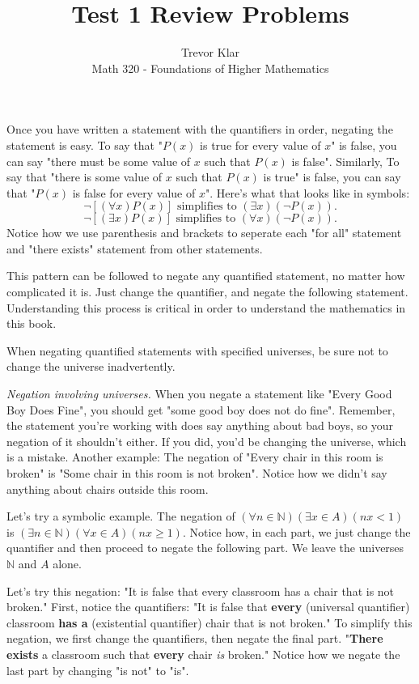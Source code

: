 \documentclass[10pt,letterpaper]{article}
\author{Trevor Klar\\
Math 320 - Foundations of Higher Mathematics}
\title{Test 1 Review Problems}
\newcommand{\N}{\mathbb{N}}
\newenvironment{remark}[2][Remark]{\begin{trivlist}
\item[\hskip \labelsep {\bfseries #1}\hskip \labelsep {\bfseries #2.}]}{\end{trivlist}}
\newenvironment{example}[2][Example]{\begin{trivlist}
\item[\hskip \labelsep {\bfseries #1}\hskip \labelsep {\bfseries #2.}]}{\end{trivlist}}
\begin{document}
\maketitle

\begin{remark}{2.12}
Once you have written a statement with the quantifiers in order, negating the statement is easy. To say  that "$P(x)$ is true for every value of $x$" is false, you can say "there must be some value of $x$ such that $P(x)$ is false". Similarly, To say  that "there is some value of $x$ such that $P(x)$ is true" is false, you can say that "$P(x)$ is false for every value of $x$". Here's what that looks like in symbols:
$$ \neg[(\forall x)P(x)] \text{ simplifies to } (\exists x)(\neg P(x)).$$
$$ \neg[(\exists x)P(x)] \text{ simplifies to } (\forall x)(\neg P(x)).$$
Notice how we use parenthesis and brackets to seperate each "for all" statement and "there exists" statement from other statements. 
\end{remark}

This pattern can be followed to negate any quantified statement, no matter how complicated it is. Just change the quantifier, and negate the following statement. Understanding this process is critical in order to understand the mathematics in this book. 

When negating quantified statements with specified universes, be sure not to change the universe inadvertently. 

\begin{example}{2.13}
\textit{Negation involving universes.} When you negate a statement like "Every Good Boy Does Fine", you should get "some good boy does not do fine". Remember, the statement you're working with does say anything about bad boys, so your negation of it shouldn't either. If you did, you'd be changing the universe, which is a mistake. Another example: The negation of "Every chair in this room is broken" is "Some chair in this room is not broken". Notice how we didn't say anything about chairs outside this room. 

Let's try a symbolic example. The negation of $(\forall n \in \N)(\exists x \in A)(nx < 1)$ is $(\exists n \in \N)(\forall x \in A)(nx \geq 1)$. Notice how, in each part, we just change the quantifier and then proceed to negate the following part. We leave the universes $\N$ and $A$ alone. 
\end{example}

\begin{example}{2.14}
Let's try this negation: "It is false that every classroom has a chair that is not broken." First, notice the quantifiers: "It is false that \textbf{every} (universal quantifier) classroom \textbf{has a} (existential quantifier) chair that is not broken." To simplify this negation, we first change the quantifiers, then negate the final part. "\textbf{There exists} a classroom such that \textbf{every} chair \textit{is} broken." Notice how we negate the last part by changing "is not" to "is".
\end{example}
\end{document}
